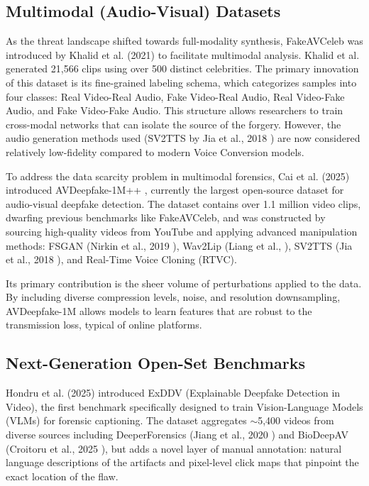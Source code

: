 \documentclass[12pt,a4paper]{report}
\begin{document}
\subsection{Multimodal (Audio-Visual) Datasets}

As the threat landscape shifted towards full-modality synthesis, FakeAVCeleb was introduced by Khalid et al. (2021) \cite{khalid2021fakeavceleb} to facilitate multimodal analysis. Khalid et al. generated 21,566 clips using over 500 distinct celebrities. The primary innovation of this dataset is its fine-grained labeling schema, which categorizes samples into four classes: Real Video-Real Audio, Fake Video-Real Audio, Real Video-Fake Audio, and Fake Video-Fake Audio. This structure allows researchers to train cross-modal networks that can isolate the source of the forgery. However, the audio generation methods used (SV2TTS by Jia et al., 2018 \cite{jia2018transfer}) are now considered relatively low-fidelity compared to modern Voice Conversion models.


To address the data scarcity problem in multimodal forensics, Cai et al. (2025) introduced AVDeepfake-1M++ \cite{cai2025avdeepfake1mlargescaleaudiovisualdeepfake}, currently the largest open-source dataset for audio-visual deepfake detection. The dataset contains over 1.1 million video clips, dwarfing previous benchmarks like FakeAVCeleb, and was constructed by sourcing high-quality videos from YouTube and applying advanced manipulation methods: FSGAN (Nirkin et al., 2019 \cite{nirkin2019fsgan}), Wav2Lip (Liang et al., \cite{liang2024wav2lip}), SV2TTS (Jia et al., 2018 \cite{jia2018transfer}), and Real-Time Voice Cloning (RTVC).


Its primary contribution is the sheer volume of perturbations applied to the data. By including diverse compression levels, noise, and resolution downsampling, AVDeepfake-1M allows models to learn features that are robust to the transmission loss, typical of online platforms.


\subsection{Next-Generation Open-Set Benchmarks}

Hondru et al. (2025) \cite{hondru2025exddv} introduced ExDDV (Explainable Deepfake Detection in Video), the first benchmark specifically designed to train Vision-Language Models (VLMs) for forensic captioning. The dataset aggregates $\sim$5,400 videos from diverse sources including DeeperForensics (Jiang et al., 2020 \cite{jiang2020deeperforensics}) and BioDeepAV (Croitoru et al., 2025 \cite{BioDeepAV2024}), but adds a novel layer of manual annotation: natural language descriptions of the artifacts and pixel-level click maps that pinpoint the exact location of the flaw.
\end{document}
